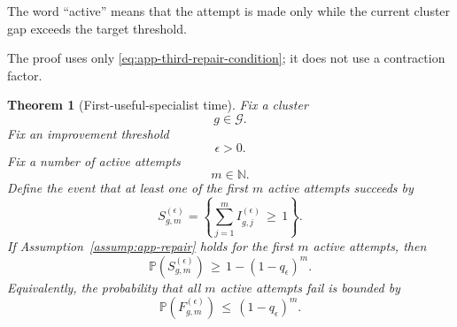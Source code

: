 \documentclass{article} %
\newtheorem{theorem}{Theorem}
\begin{document}
The word ``active'' means that the attempt is made only while the current cluster gap exceeds the target threshold.

The proof uses only \eqref{eq:app-third-repair-condition}; it does not use a contraction factor.

\begin{theorem}[First-useful-specialist time]
\label{thm:generalization}
Fix a cluster
\begin{equation}
\label{eq:app-third-thm-g}
g
\in
\mathcal{G}.
\end{equation}
Fix an improvement threshold
\begin{equation}
\label{eq:app-third-thm-eps}
\epsilon
>
0.
\end{equation}
Fix a number of active attempts
\begin{equation}
\label{eq:app-third-thm-m}
m
\in
\mathbb{N}.
\end{equation}
Define the event that at least one of the first \(m\) active attempts succeeds by
\begin{equation}
\label{eq:app-third-success-event}
S_{g,m}^{(\epsilon)}
=
\left\{
\sum_{j=1}^{m}
I_{g,j}^{(\epsilon)}
\,\ge\,
1
\right\}.
\end{equation}
If Assumption~\ref{assump:app-repair} holds for the first \(m\) active attempts, then
\begin{equation}
\label{eq:app-third-main-bound}
\mathbb{P}\!\left(
S_{g,m}^{(\epsilon)}
\right)
\,\ge\,
1-(1-q_{\epsilon})^{m}.
\end{equation}
Equivalently, the probability that all \(m\) active attempts fail is bounded by
\begin{equation}
\label{eq:app-third-tail-bound}
\mathbb{P}\!\left(
F_{g,m}^{(\epsilon)}
\right)
\,\le\,
(1-q_{\epsilon})^{m}.
\end{equation}
\end{theorem}
\end{document}
